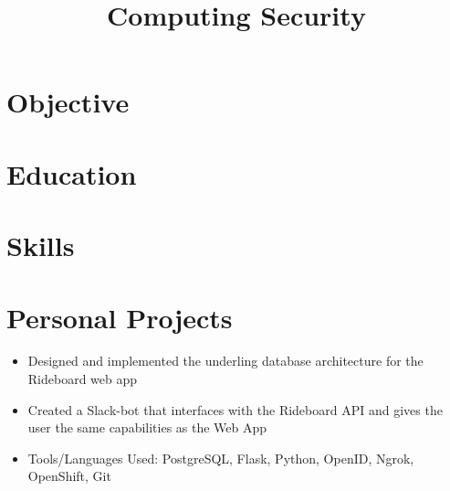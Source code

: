 \documentclass[11.99pt,letterpaper,sans]{moderncv}        %
\title{Computing Security}                               %
\begin{document}
\makecvtitle
\section{Objective}
\section{Education}

\section{Skills}
\begin{multicols}{5}
	\columnbreak
	\columnbreak
	\columnbreak
	\columnbreak
\end{multicols}


\section{Personal Projects}
{\begin{itemize}%
	\item Designed and implemented the underling database architecture for the Rideboard web app 
	\item Created a Slack-bot that interfaces with the Rideboard API and gives the user the same capabilities as the Web App
	\item Tools/Languages Used: PostgreSQL, Flask, Python, OpenID, Ngrok, OpenShift, Git\\
	\end{itemize}}
\end{document}
